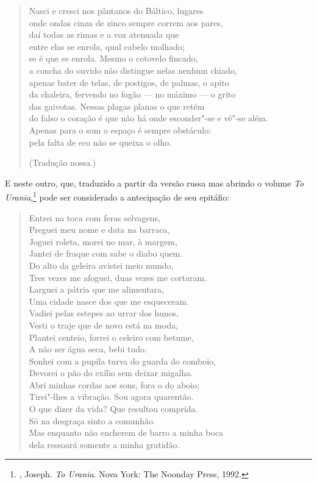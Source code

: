 {\begin{verse}
Nasci e cresci nos pântanos do Báltico, \qb{}lugares \\
onde ondas cinza de zinco sempre correm \qb{}aos pares, \\
daí todas as rimas e a voz atenuada que \\
entre elas se enrola, qual cabelo molhado; \\
se é que se enrola. Mesmo o cotovelo \qb{}fincado, \\
a concha do ouvido não distingue nelas \qb{}nenhum chiado, \\
apenas bater de telas, de postigos, \qb{}de palmas, o apito \\
da chaleira, fervendo no fogão --- no máximo \qb{}--- o grito \\
das gaivotas. Nessas plagas planas o que \qb{}retém \\
do falso o coração é que não há onde \qb{}esconder"-se e vê"-se além. \\
Apenas para o som o espaço é sempre \qb{}obstáculo: \\
pela falta de eco não se queixa o olho.

(Tradução nossa.)
\end{verse}

E neste outro, que, traduzido a partir da versão russa mas abrindo o 
volume \emph{To Urania},\footnote{, Joseph. 
\emph{To Urania}. Nova York: The Noonday Press, 1992.} pode ser
 considerado a antecipação de seu epitáfio:

\begin{verse}
Entrei na toca com feras selvagens, \\
Preguei meu nome e data na barraca, \\
Joguei roleta, morei no mar, à margem, \\
Jantei de fraque com sabe o diabo quem. \\[8pt]
Do alto da geleira avistei meio mundo, \\
Tres vezes me afoguei, duas vezes me \qb{}cortaram. \\
Larguei a pátria que me alimentara, \\
Uma cidade nasce dos que me esqueceram. \\[8pt]
Vadiei pelas estepes ao urrar dos hunos, \\
Vesti o traje que de novo está na moda, \\
Plantei centeio, forrei o celeiro com betume, \\
A não ser água seca, bebi tudo. \\[8pt]
Sonhei com a pupila turva do guarda do \qb{}comboio, \\
Devorei o pão do exílio sem deixar migalha. \\
Abri minhas cordas aos sons, fora o do aboio; \\
Tirei"-lhes a vibração. Sou agora quarentão. \\[8pt]
O que dizer da vida? Que resultou comprida. \\
Só na desgraça sinto a comunhão. \\
Mas enquanto não encherem de barro a \qb{}minha boca \\
dela ressoará somente a minha gratidão.


\end{verse}}
